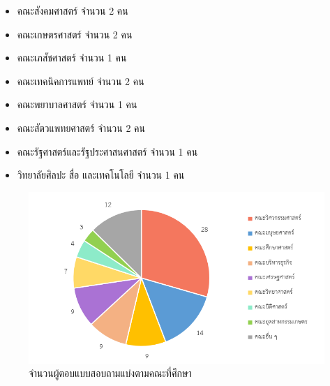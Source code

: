 \begin{itemize}
  \item คณะสังคมศาสตร์ จำนวน 2 คน
  \item คณะเกษตรศาสตร์ จำนวน 2 คน
  \item คณะเภสัชศาสตร์ จำนวน 1 คน
  \item คณะเทคนิคการแพทย์ จำนวน 2 คน
  \item คณะพยาบาลศาสตร์ จำนวน 1 คน
  \item คณะสัตวแพทยศาสตร์ จำนวน 2 คน
  \item คณะรัฐศาสตร์และรัฐประศาสนศาสตร์ จำนวน 1 คน
  \item วิทยาลัยศิลปะ สื่อ และเทคโนโลยี จำนวน 1 คน
\end{itemize}
\begin{figure}
  \begin{center}
    \includegraphics[width=\linewidth]{images/group_by_faculty.png}
  \end{center}
  \caption[Poem]{จำนวนผู้ตอบแบบสอบถามแบ่งตามคณะที่ศึกษา}
  \label{fig:faculty}     
\end{figure}

